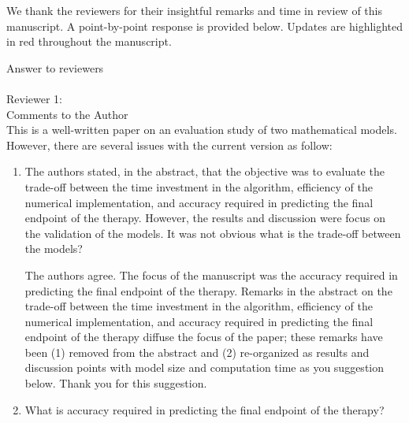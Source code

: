 \documentclass[letterpaper,12pt]{report}
\begin{document}
{\color{red}
We thank the reviewers for their insightful remarks and time in review of
this manuscript. A point-by-point response is provided below.
Updates are highlighted in red throughout the manuscript. 
}

Answer to reviewers\\
\\
Reviewer 1:\\
Comments to the Author\\
This is a well-written paper on an evaluation study of
two mathematical models. However, there are several issues with the current version as follow:\\

\begin{enumerate}
\item
The authors stated, in the abstract, that the objective
was to evaluate the trade-off between the
time investment in the algorithm, efficiency of the numerical
implementation, and accuracy required in
predicting the final endpoint of the therapy. However,
the results and discussion were focus on the validation
of the models. It was not obvious what is the trade-off
between the models? 

{\color{red}
The authors agree. The focus of the manuscript was
the accuracy required in
predicting the final endpoint of the therapy. 
Remarks in the abstract on the trade-off between the
time investment in the algorithm, efficiency of the numerical
implementation, and accuracy required in
predicting the final endpoint of the therapy diffuse the focus
of the paper; these remarks have been (1) removed from the abstract and (2)
re-organized as results and  discussion points with model size and
computation time as you suggestion below.  Thank you for this suggestion.
}


\item What is accuracy required in predicting the final endpoint of the therapy?
 
{\color{red}

}
\end{enumerate}
\end{document}
